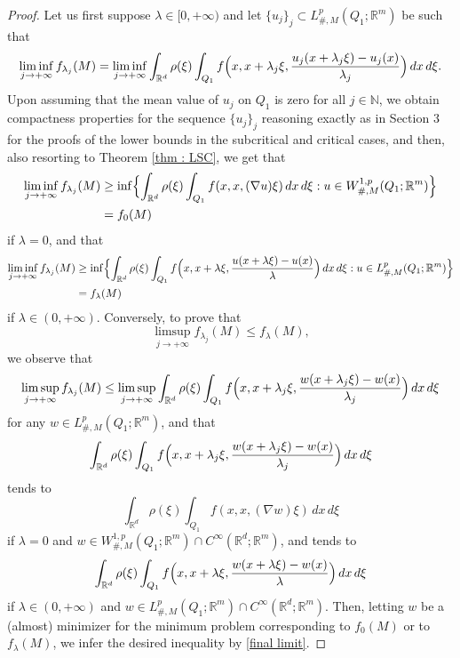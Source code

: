 \documentclass{article}
\theoremstyle{definition}
\newcommand{\N}{\mathbb{N}}
\newcommand{\R}{\mathbb{R}}
\begin{document}
\begin{proof}
    Let us first suppose $\lambda \in [0,+\infty)$ and let $\{u_j\}_j\subset L^p_{\#,M}(Q_1;\R^m)$ be such that
    \begin{equation*}
       \liminf_{j\to+\infty}f_{\lambda_j}(M)
        = \liminf_{j\to+\infty}  \int_{\R^d} \rho(\xi)\int_{Q_1} f\Bigl(x,x+\lambda_j\xi,\frac{u_j(x+\lambda_j\xi)-u_j(x)}{\lambda_j}\Bigr)\, dx\,d\xi. 
    \end{equation*}
Upon assuming that the mean value of $u_j$ on $Q_1$ is zero for all $j\in\N$, we obtain compactness properties for the sequence $\{u_j\}_j$ reasoning exactly as in Section $3$ for the proofs of the lower bounds in the subcritical and critical cases, and then, also resorting to Theorem \ref{thm : LSC}, we get that
    \begin{align*}
        \liminf_{j\to+\infty}f_{\lambda_j}(M) &\geq \inf\Bigl\{ \int_{\R^d} \rho(\xi)\int_{Q_1} f(x,x,(\nabla u ) \xi)\, dx\,d\xi : u\in W^{1,p}_{\#,M}(Q_1; \R^m) \Bigr\} \\
        & = f_{0}(M)
    \end{align*}
    if $\lambda=0$, and that
    \begin{align*}
  \liminf_{j\to+\infty}f_{\lambda_j}(M) & \geq \inf\Bigl\{ \int_{\R^d} \rho(\xi)\int_{Q_1} f\Bigl(x,x+\lambda\xi,\frac{u(x+\lambda\xi)-u(x)}{\lambda}\Bigr)\, dx\, d\xi : u\in L^p_{\#,M}(Q_1;\R^m) \Bigr\} \\
  & = f_\lambda(M)
\end{align*}
if $\lambda\in(0,+\infty)$. Conversely, to prove that
\begin{equation*}
    \limsup_{j\to+\infty}f_{\lambda_j}(M) \leq f_\lambda(M) ,
\end{equation*}
we observe that
\begin{equation}\label{final limit}
    \limsup_{j\to+\infty}f_{\lambda_j}(M) \leq \limsup_{j\to+\infty}\int_{\R^d} \rho(\xi)\int_{Q_1} f\Bigl(x,x+\lambda_j\xi,\frac{w(x+\lambda_j\xi)-w(x)}{\lambda_j}\Bigr)\, dx\, d\xi
\end{equation}
for any $w\in L^p_{\#,M}(Q_1; \R^m)$, and that
\begin{equation*}
    \int_{\R^d} \rho(\xi)\int_{Q_1} f\Bigl(x,x+\lambda_j\xi,\frac{w(x+\lambda_j\xi)-w(x)}{\lambda_j}\Bigr)\, dx\, d\xi
\end{equation*}
tends to 
\begin{equation*}
    \int_{\R^d} \rho(\xi)\int_{Q_1} f(x,x,(\nabla w ) \xi)\, dx\,d\xi
\end{equation*}
if $\lambda=0$ and $w\in W^{1,p}_{\#,M}(Q_1; \R^m)\cap C^\infty(\R^d;\R^m)$, and tends to
\begin{equation*}
    \int_{\R^d} \rho(\xi)\int_{Q_1} f\Bigl(x,x+\lambda\xi,\frac{w(x+\lambda\xi)-w(x)}{\lambda}\Bigr)\, dx\, d\xi
\end{equation*}
if $\lambda\in(0,+\infty)$ and $w\in L^p_{\#,M}(Q_1; \R^m)\cap C^\infty(\R^d;\R^m)$. Then, letting $w$ be a (almost) minimizer for the minimum problem corresponding to $f_0(M)$ or to $f_\lambda(M)$, we infer the desired inequality by \eqref{final limit}.


\end{proof}
\end{document}
